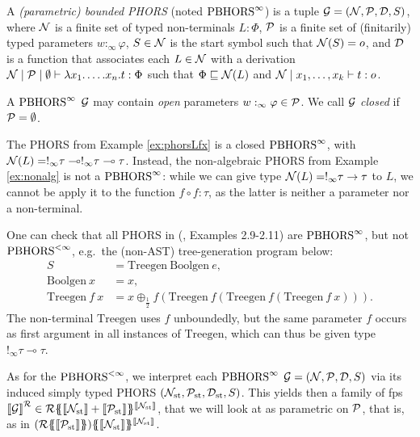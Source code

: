 \begin{definition}[$\Ginf$]
A \emph{(parametric) bounded PHORS} (noted $\Ginf$) is a tuple $\mathcal{G}=(\mathcal{N}, \mathcal{P},\mathcal{D}, S)$, where $\mathcal{N}$ is a finite set of typed non-terminals $L:\Phi$, $\mathcal{P}$ is a finite set of (finitarily) typed parameters $w:_\infty\varphi$, $S\in\mathcal{N}$ is the {start symbol} such that $\mathcal{N}(S)=o$, and $\mathcal{D}$ is a function that associates each $L\in\mathcal{N}$ with a derivation $\mathcal{N}\mid\mathcal{P}\mid\emptyset\vdash \lambda x_1.\dots. x_n.t:\Phi$ such that $\Phi\sqsubseteq \mathcal{N}(L)$ and $\mathcal{N}\mid x_1,\dots, x_k\vdash t:o$. 

\end{definition} 

A $\Ginf$ $\mathcal{G}$ may contain \emph{open} parameters $w:_\infty\varphi\in \mathcal{P}$. We call $ \mathcal{G}$ \emph{closed} if $\mathcal{P}=\emptyset$. 


The PHORS from Example \eqref{ex:phorsLfx} is a closed $\Ginf$, with $\mathcal{N}(L)=!_\infty\tau\multimap!_\infty\tau\multimap\tau$. 
Instead, the non-algebraic PHORS from Example \eqref{ex:nonalg} is not a $\Ginf$:
while we can give type $\mathcal{N}(L)=!_\infty \tau\to \tau$ to $L$, we cannot be apply it to the function $f\circ f:\tau$, as the latter is neither a parameter nor a non-terminal. 

\begin{example}
One can check that all PHORS in (\cite{DBLP:journals/lmcs/KobayashiLG20}, Examples 2.9-2.11) are $\Ginf$, but not $\text{PBHORS}^{<\infty}$, e.g.~the (non-AST) tree-generation program below:
\begin{align*}
S&= \mathrm{Treegen} \ \mathrm{Boolgen} \ e,\\
\mathrm{Boolgen}\ x&= x,\\
\mathrm{Treegen} \ f\  x &= x\oplus_{\frac{1}{2}}f(\mathrm{Treegen}\ f( \mathrm{Treegen} \ f( \mathrm{Treegen}\ f\ x))).
\end{align*}
The non-terminal $\mathrm{Treegen}$ uses $f$ unboundedly, but the same parameter $f$ occurs as first argument in all instances of $\mathrm{Treegen}$, which can thus be given type $!_\infty\tau \multimap \tau$.
 \end{example}


As for the $\text{PBHORS}^{<\infty}$, we interpret each $\Ginf$ $\mathcal{G}=(\mathcal{N},\mathcal{P}, \mathcal{D},S)$ via its
induced simply typed PHORS $({\mathcal{N}}_{\mathrm{st}},{\mathcal{P}}_{\mathrm{st}},{\mathcal{D}}_{\mathrm{st}},S)$.
This yields then a family of fps
${\llbracket{\mathcal{G}}\rrbracket}^{\mathcal{R}}\in {\mathcal{R}}\{\!\!\{\llbracket{\mathcal{N}}_{\mathrm{st}}\rrbracket+\llbracket{\mathcal{P}}_{\mathrm{st}}\rrbracket\}\!\!\}^{\llbracket{\mathcal{N}}_{\mathrm{st}}\rrbracket}$, that we will look at as parametric on $\mathcal{P}$, that is, as 
in $\fps{(\fps{\Rsemiring}{\model{\sat{\C P}}})}{\model{\sat\nonterm} }^{\model{\sat\nonterm}}$.
%





